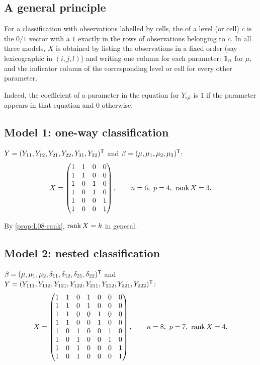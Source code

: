 \subsection{A general principle}
\begin{definition}\label{def:L11-indicator}
For a classification with observations labelled by cells, the  of a
level (or cell) $c$ is the $0/1$ vector with a $1$ exactly in the rows of observations belonging
to $c$. In all three models, $X$ is obtained by listing the observations in a fixed order (say
lexicographic in $(i,j,l)$) and writing one column for each parameter: $\mathbf 1_n$ for $\mu$, and the
indicator column of the corresponding level or cell for every other parameter.
\end{definition}
Indeed, the coefficient of a parameter in the equation for $Y_{ijl}$ is $1$ if the parameter
appears in that equation and $0$ otherwise.

\subsection{Model 1: one-way classification}
\begin{example}[$k=3$, $n_1=n_2=n_3=2$]\label{ex:L11-oneway}
$Y=(Y_{11},Y_{12},Y_{21},Y_{22},Y_{31},Y_{32})^{\mathsf T}$ and $\beta=(\mu,\mu_1,\mu_2,\mu_3)^{\mathsf T}$:
\[
X=\begin{pmatrix}
1&1&0&0\\1&1&0&0\\1&0&1&0\\1&0&1&0\\1&0&0&1\\1&0&0&1
\end{pmatrix},\qquad n=6,\ p=4,\ \operatorname{rank} X=3 .
\]
\end{example}
By \cref{prop:L08-rank}, $\operatorname{rank} X=k$ in general.

\subsection{Model 2: nested classification}
\begin{example}[$k=2$, $m_1=m_2=2$, $n_{ij}=2$]\label{ex:L11-nested}
$\beta=(\mu,\mu_1,\mu_2,\delta_{11},\delta_{12},\delta_{21},\delta_{22})^{\mathsf T}$ and
$Y=(Y_{111},Y_{112},Y_{121},Y_{122},Y_{211},Y_{212},Y_{221},Y_{222})^{\mathsf T}$:
\[
X=\begin{pmatrix}
1&1&0&1&0&0&0\\
1&1&0&1&0&0&0\\
1&1&0&0&1&0&0\\
1&1&0&0&1&0&0\\
1&0&1&0&0&1&0\\
1&0&1&0&0&1&0\\
1&0&1&0&0&0&1\\
1&0&1&0&0&0&1
\end{pmatrix},\qquad n=8,\ p=7,\ \operatorname{rank} X=4 .
\]
\end{example}

